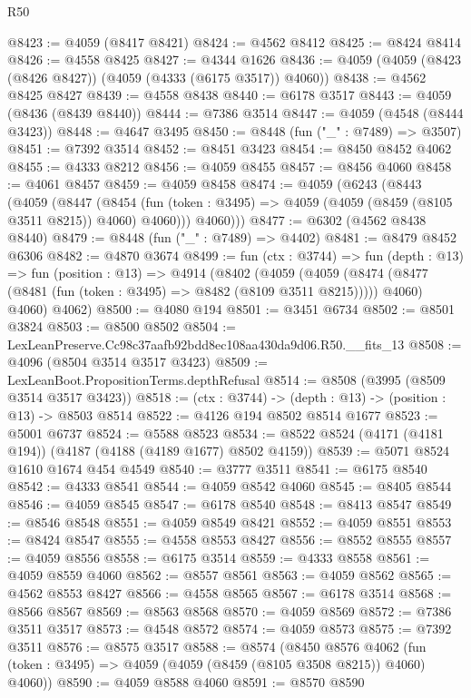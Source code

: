 \begin{lexlean}{R50}
\begin{coremodule}
@8423 := @4059 (@8417 @8421)
@8424 := @4562 @8412
@8425 := @8424 @8414
@8426 := @4558 @8425
@8427 := @4344 @1626
@8436 := @4059 (@4059 (@8423 (@8426 @8427)) (@4059 (@4333 (@6175 @3517)) @4060))
@8438 := @4562 @8425 @8427
@8439 := @4558 @8438
@8440 := @6178 @3517
@8443 := @4059 (@8436 (@8439 @8440))
@8444 := @7386 @3514
@8447 := @4059 (@4548 (@8444 @3423))
@8448 := @4647 @3495
@8450 := @8448 (fun ("_" : @7489) => @3507)
@8451 := @7392 @3514
@8452 := @8451 @3423
@8454 := @8450 @8452 @4062
@8455 := @4333 @8212
@8456 := @4059 @8455
@8457 := @8456 @4060
@8458 := @4061 @8457
@8459 := @4059 @8458
@8474 := @4059
    (@6243
      (@8443
        (@4059
          (@8447
            (@8454 (fun (token : @3495) => @4059 (@4059 (@8459 (@8105 @3511 @8215)) @4060) @4060)))
          @4060)))
@8477 := @6302 (@4562 @8438 @8440)
@8479 := @8448 (fun ("_" : @7489) => @4402)
@8481 := @8479 @8452 @6306
@8482 := @4870 @3674
@8499 := fun (ctx : @3744) =>
  fun (depth : @13) =>
  fun (position : @13) =>
  @4914
    (@8402
      (@4059
        (@4059 (@8474 (@8477 (@8481 (fun (token : @3495) => @8482 (@8109 @3511 @8215))))) @4060)
        @4060)
      @4062)
@8500 := @4080 @194
@8501 := @3451 @6734
@8502 := @8501 @3824
@8503 := @8500 @8502
@8504 := LexLeanPreserve.Cc98c37aafb92bdd8ec108aa430da9d06.R50.__fits_13
@8508 := @4096 (@8504 @3514 @3517 @3423)
@8509 := LexLeanBoot.PropositionTerms.depthRefusal
@8514 := @8508 (@3995 (@8509 @3514 @3517 @3423))
@8518 := (ctx : @3744) -> (depth : @13) -> (position : @13) -> @8503 @8514
@8522 := @4126 @194 @8502 @8514 @1677
@8523 := @5001 @6737
@8524 := @5588 @8523
@8534 := @8522 @8524 (@4171 (@4181 @194)) (@4187 (@4188 (@4189 @1677) @8502 @4159))
@8539 := @5071 @8524 @1610 @1674 @454 @4549
@8540 := @3777 @3511
@8541 := @6175 @8540
@8542 := @4333 @8541
@8544 := @4059 @8542 @4060
@8545 := @8405 @8544
@8546 := @4059 @8545
@8547 := @6178 @8540
@8548 := @8413 @8547
@8549 := @8546 @8548
@8551 := @4059 @8549 @8421
@8552 := @4059 @8551
@8553 := @8424 @8547
@8555 := @4558 @8553 @8427
@8556 := @8552 @8555
@8557 := @4059 @8556
@8558 := @6175 @3514
@8559 := @4333 @8558
@8561 := @4059 @8559 @4060
@8562 := @8557 @8561
@8563 := @4059 @8562
@8565 := @4562 @8553 @8427
@8566 := @4558 @8565
@8567 := @6178 @3514
@8568 := @8566 @8567
@8569 := @8563 @8568
@8570 := @4059 @8569
@8572 := @7386 @3511 @3517
@8573 := @4548 @8572
@8574 := @4059 @8573
@8575 := @7392 @3511
@8576 := @8575 @3517
@8588 := @8574
    (@8450
      @8576
      @4062
      (fun (token : @3495) => @4059 (@4059 (@8459 (@8105 @3508 @8215)) @4060) @4060))
@8590 := @4059 @8588 @4060
@8591 := @8570 @8590

\end{coremodule}
\end{lexlean}
